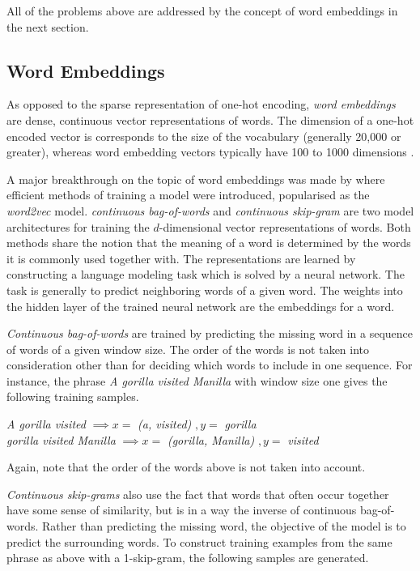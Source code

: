 All of the problems above are addressed by the concept of word embeddings in the next section. 

\subsection{Word Embeddings}
As opposed to the sparse representation of one-hot encoding, \textit{word embeddings} are dense, continuous vector representations of words. The dimension of a one-hot encoded vector is corresponds to the size of the vocabulary (generally 20,000 or greater), whereas word embedding vectors typically have 100 to 1000 dimensions \citep{chollet2017deep}.

A major breakthrough on the topic of word embeddings was made by \citet{mikolov2013efficient} where efficient methods of training a model were introduced, popularised as the \textit{word2vec} model. \textit{continuous bag-of-words} and \textit{continuous skip-gram} are two model architectures for training the $d$-dimensional vector representations of words. Both methods share the notion that the meaning of a word is determined by the words it is commonly used together with. The representations are learned by constructing a language modeling task which is solved by a neural network. The task is generally to predict neighboring words of a given word. The weights into the hidden layer of the trained neural network are the embeddings for a word. 

\textit{Continuous bag-of-words} are trained by predicting the missing word in a sequence of words of a given window size. The order of the words is not taken into consideration other than for deciding which words to include in one sequence. For instance, the phrase \textit{A gorilla visited Manilla} with window size one gives the following training samples.
\begin{center}
\textit{A gorilla visited} $\implies x = $ \textit{(a, visited)} $,y = $ \textit{gorilla} \\ \vspace{1em}
\textit{gorilla visited Manilla} $\implies x = $ \textit{(gorilla, Manilla)} $,y = $ \textit{visited} \\
\end{center}

Again, note that the order of the words above is not taken into account.

\textit{Continuous skip-grams} also use the fact that words that often occur together have some sense of similarity, but is in a way the inverse of continuous bag-of-words. Rather than predicting the missing word, the objective of the model is to predict the surrounding words. To construct training examples from the same phrase as above with a 1-skip-gram, the following samples are generated. 


